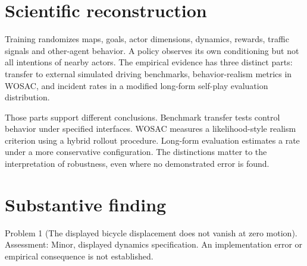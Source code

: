 \documentclass[10pt]{article}
\begin{document}
\section*{Scientific reconstruction}
Training randomizes maps, goals, actor dimensions, dynamics, rewards, traffic signals and other-agent behavior. A policy observes its own conditioning but not all intentions of nearby actors. The empirical evidence has three distinct parts: transfer to external simulated driving benchmarks, behavior-realism metrics in WOSAC, and incident rates in a modified long-form self-play evaluation distribution.\par
Those parts support different conclusions. Benchmark transfer tests control behavior under specified interfaces. WOSAC measures a likelihood-style realism criterion using a hybrid rollout procedure. Long-form evaluation estimates a rate under a more conservative configuration. The distinctions matter to the interpretation of robustness, even where no demonstrated error is found.\par
\section*{Substantive finding}
Problem 1 (The displayed bicycle displacement does not vanish at zero motion).  Assessment: Minor, displayed dynamics specification. An implementation error or empirical consequence is not established.\par
\end{document}
